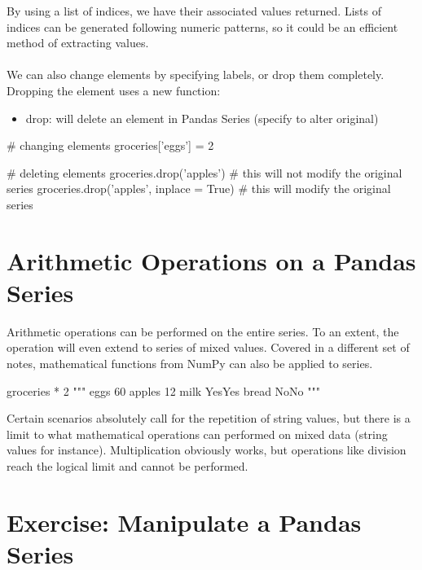 \documentclass{article}
\begin{document}
By using a list of indices, we have their associated values returned. Lists of indices can be generated following numeric patterns, so it could be an efficient method of extracting values.
\\\\

We can also change elements by specifying labels, or drop them completely. Dropping the element uses a new function:

\begin{itemize}
	\item drop: will delete an element in Pandas Series (specify to alter original)
\end{itemize}

\begin{python}
	# changing elements
	groceries['eggs'] = 2
	
	# deleting elements
	groceries.drop('apples') # this will not modify the original series
	groceries.drop('apples', inplace = True) # this will modify the original series
\end{python}


\section{Arithmetic Operations on a Pandas Series}\label{sec:concept3}

Arithmetic operations can be performed on the entire series. To an extent, the operation will even extend to series of mixed values. Covered in a different set of notes, mathematical functions from NumPy can also be applied to series.

\begin{python}
	groceries * 2
	"""
	eggs          60
	apples        12
	milk      YesYes
	bread       NoNo
	"""
\end{python}

Certain scenarios absolutely call for the repetition of string values, but there is a limit to what mathematical operations can performed on mixed data (string values for instance). Multiplication obviously works, but operations like division reach the logical limit and cannot be performed.


\section{Exercise: Manipulate a Pandas Series}\label{sec:exercise1}
\end{document}
